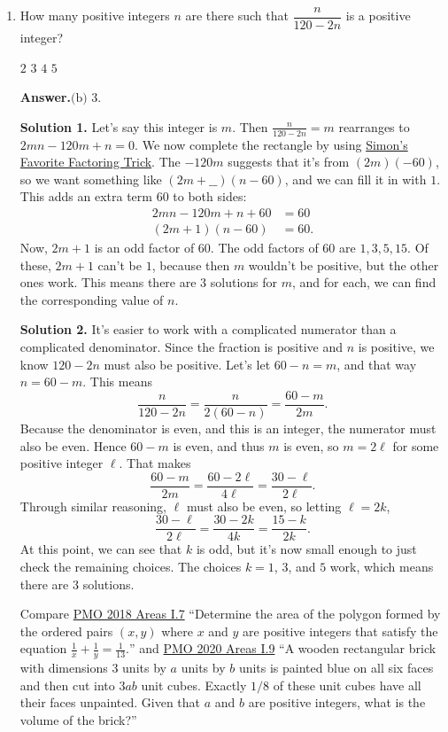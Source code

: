 \documentclass[11pt,paper=letter]{scrartcl}
\newcommand{\ansb}[2]{{\sffamily \bfseries Answer.}\;\(\boxed{\text{(#1) #2}}\).}
\newcommand{\soln}[1]{{\sffamily \bfseries Solution #1.}\;}
\newenvironment{rem}%
{\noindent \ignorespaces \small \sffamily \sansmath {\bfseries Remark.}}%
{\ignorespacesafterend}
\begin{document}
\begin{enumerate}[align=left,leftmargin=*]
\item How many positive integers $n$ are there such that $\dfrac{n}{120-2n}$ is a positive integer?

\fourch
{$2$}
{$3$}
{$4$}
{$5$}

\ansb{b}{$3$}

\soln1 Let's say this integer is $m$. Then $\frac{n}{120 - 2n} = m$ rearranges to $2mn - 120m + n = 0.$ We now complete the rectangle by using \href{https://artofproblemsolving.com/wiki/index.php/Simon%27s_Favorite_Factoring_Trick}{Simon's Favorite Factoring Trick}. The $-120m$ suggests that it's from $(2m)(-60)$, so we want something like $(2m + \_\_)(n - 60)$, and we can fill it in with $1$. This adds an extra term $60$ to both sides:
\begin{align*}
2mn - 120m + n + 60 &= 60 \\
(2m + 1)(n - 60) &= 60.
\end{align*}
Now, $2m + 1$ is an odd factor of $60$. The odd factors of $60$ are $1, 3, 5, 15$. Of these, $2m + 1$ can't be $1$, because then $m$ wouldn't be positive, but the other ones work. This means there are $3$ solutions for $m$, and for each, we can find the corresponding value of $n$.

\soln2 It's easier to work with a complicated numerator than a complicated denominator. Since the fraction is positive and $n$ is positive, we know $120 - 2n$ must also be positive. Let's let $60 - n = m$, and that way $n = 60 - m$. This means \[\dfrac{n}{120 - 2n} = \frac{n}{2(60 - n)} = \dfrac{60 - m}{2m}.\] Because the denominator is even, and this is an integer, the numerator must also be even. Hence $60 - m$ is even, and thus $m$ is even, so $m = 2\ell$ for some positive integer $\ell$. That makes \[\dfrac{60 - m}{2m} = \frac{60 - 2\ell}{4\ell} = \dfrac{30 - \ell}{2\ell}.\] Through similar reasoning, $\ell$ must also be even, so letting $\ell = 2k$, \[
  \dfrac{30 - \ell}{2\ell} = \frac{30 - 2k}{4k} = \frac{15 - k}{2k}.
\]
At this point, we can see that $k$ is odd, but it's now small enough to just check the remaining choices. The choices $k = 1$, $3$, and $5$ work, which means there are $3$ solutions.

\begin{rem}
Compare \href{https://cjquines.com/files/pmo2018areas.pdf}{PMO 2018 Areas I.7} ``Determine the area of the polygon formed by the ordered pairs $(x, y)$ where $x$ and $y$ are positive integers that satisfy the equation $\frac1x + \frac1y = \frac1{13}.$'' and \href{https://cjquines.com/files/pmo2020areas.pdf}{PMO 2020 Areas I.9} ``A wooden rectangular brick with dimensions $3$ units by $a$ units by $b$ units is painted blue on all six faces and then cut into $3ab$ unit cubes. Exactly $1/8$ of these unit cubes have all their faces unpainted. Given that $a$ and $b$ are positive integers, what is the volume of the brick?''
\end{rem}


\end{enumerate}
\end{document}
